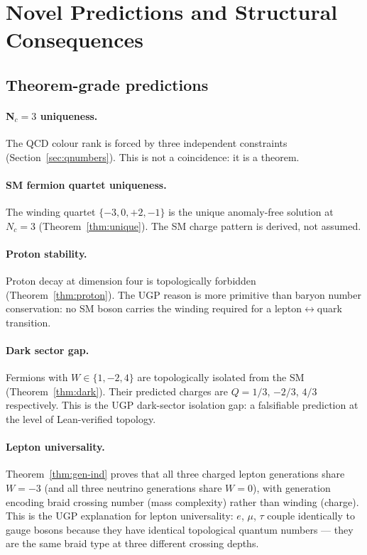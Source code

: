\documentclass[12pt]{article}
\theoremstyle{remark}
\begin{document}
\section{Novel Predictions and Structural Consequences}
\label{sec:predictions}

\subsection{Theorem-grade predictions}

\paragraph{N$_c = 3$ uniqueness.}
The QCD colour rank is forced by three independent constraints
(Section~\ref{sec:qnumbers}).  This is not a coincidence: it is a theorem.

\paragraph{SM fermion quartet uniqueness.}
The winding quartet $\{-3, 0, +2, -1\}$ is the unique anomaly-free solution at
$N_c = 3$ (Theorem~\ref{thm:unique}).  The SM charge pattern is derived, not
assumed.

\paragraph{Proton stability.}
Proton decay at dimension four is topologically forbidden
(Theorem~\ref{thm:proton}).  The UGP reason is more primitive than baryon
number conservation: no SM boson carries the winding required for a
lepton$\leftrightarrow$quark transition.

\paragraph{Dark sector gap.}
Fermions with $W \in \{1, -2, 4\}$ are topologically isolated from the SM
(Theorem~\ref{thm:dark}).  Their predicted charges are $Q = 1/3$, $-2/3$,
$4/3$ respectively.  This is the UGP dark-sector isolation gap: a falsifiable prediction
at the level of Lean-verified topology.

\paragraph{Lepton universality.}
Theorem~\ref{thm:gen-ind} proves that all three charged lepton generations
share $W = -3$ (and all three neutrino generations share $W = 0$), with
generation encoding braid crossing number (mass complexity) rather than
winding (charge).  This is the UGP explanation for lepton universality:
$e$, $\mu$, $\tau$ couple identically to gauge bosons because they have
identical topological quantum numbers --- they are the same braid type at
three different crossing depths.
\end{document}

